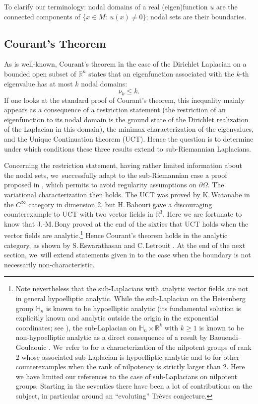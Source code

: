 \documentclass[JEP,XML,SOM,Unicode,published]{cedram}
\theoremstyle{definition}
\newcommand{\1}{\mathbbm{1}}
\begin{document}
To clarify our terminology: nodal domains of a real (eigen)function $u$ are the connected components of $\{ x\in M:\ u(x) \neq 0\}$; nodal sets are their boundaries.

\subsection{Courant's Theorem}
As is well-known, Courant's theorem in the case of the Dirichlet Laplacian on a bounded open subset of $\mathbb R^n$ states that an eigenfunction associated with the $k$-th eigenvalue has at most $k$ nodal domains:
\[
\nu_k \leq k.
\]
If one looks at the standard proof of Courant's theorem, this inequality mainly appears as a consequence of a restriction statement (the restriction of an eigenfunction to its nodal domain is the ground state of the Dirichlet realization of the Laplacian in this domain), the minimax characterization of the eigenvalues, and the Unique Continuation theorem (UCT). Hence the question is to determine under which conditions these three results extend to sub-Riemannian Laplacians.

Concerning the restriction statement, having rather limited information about the nodal sets, we~successfully adapt to the sub-Riemannian case a proof proposed in \cite{MP}, which permits to avoid regularity assumptions on $\partial \Omega$. The variational characterization then holds. The UCT was proved by K.\,Watanabe \cite{Wa} in the $C^\infty$ category in dimension 2, but H.\,Bahouri \cite{Ba, Ba2} gave a discouraging counterexample to UCT with two vector fields in $ \mathbb R^3$.
Here
we are fortunate to know that J.-M.\,Bony proved at the end of the sixties \cite{Bo} that UCT holds when the vector fields are analytic.\footnote{Note nevertheless that the sub-Laplacians with analytic vector fields are not in general hypoelliptic analytic. While the sub-Laplacian on the Heisenberg group $\mathbb H_n$ is known to be hypoelliptic analytic (its fundamental solution is explicitly known and analytic outside the origin
in the exponential coordinates; see \cite{Fo0}), the sub-Laplacian on $\mathbb H_n\times \mathbb R^k$ with $k\geq 1$ is known to be non-hypoelliptic analytic as a direct consequence of a result by Baouendi--Goulaouic \cite{BaGo}. We~refer to \cite{Me2} for a characterization of the nilpotent groups of rank $2$ whose associated sub-Laplacian is hypoelliptic analytic and to \cite{Hel} for other counterexamples when the rank of nilpotency is strictly larger than $2$. Here we have limited our references to the case of sub-Laplacians on nilpotent groups. Starting in the seventies there have been a lot of contributions on the subject, in particular around an ``evoluting'' Trèves conjecture.}
Hence Courant's theorem holds in the analytic category, as shown by S.\,Eswarathasan and C.\,Letrouit \cite{EL}. At the end of the next section, we~will extend statements given in \cite{EL} to the case when the boundary is not necessarily non-characteristic.
\end{document}
